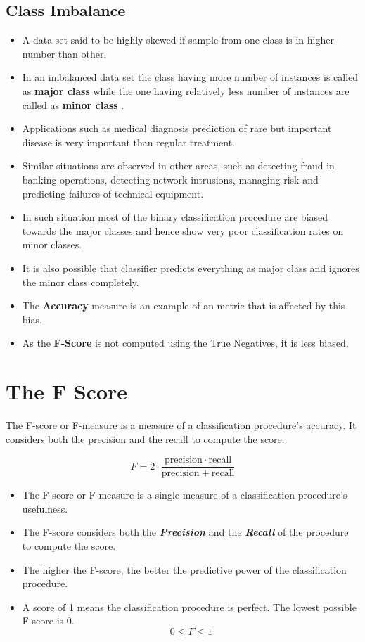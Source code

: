 \documentclass[]{report}
\begin{document}
\subsection*{Class Imbalance}
\begin{itemize}
\item 	A data set said to be highly skewed if sample from one class is in higher number than other. \item In an imbalanced data set the class having more number of instances is called as \textbf{major class} while the one having relatively less number of instances are called as \textbf{minor class} .
\item Applications such as medical diagnosis prediction of rare but important disease is very important than regular treatment. 
\item Similar situations are observed in other areas, such as detecting fraud in banking operations, detecting network intrusions, managing risk and predicting failures of technical equipment. 
\item In such situation most of the binary classification procedure are biased towards the major classes and hence show very poor classification rates on minor classes.
\item  It is also possible that classifier predicts everything as major class and ignores the minor class completely.
\item The \textbf{Accuracy} measure is an example of an metric that is affected by this bias.
\item As the \textbf{F-Score} is not computed using the True Negatives, it is less biased.
\end{itemize}


\section*{The F Score}

The F-score or F-measure is a measure of a classification procedure's accuracy.
It considers both the precision  and the recall to compute the score.

\[ F = 2 \cdot \frac{\mathrm{precision} \cdot \mathrm{recall}}{\mathrm{precision} + \mathrm{recall}}\]

\begin{itemize}
	\item The F-score or F-measure is a single measure of a classification procedure's usefulness. 
	\item The F-score considers both the \textit{\textbf{Precision}} and the \textit{\textbf{Recall}} of the procedure to compute the score.
	\item The higher the F-score, the better the predictive power of the 
	classification procedure. 
	\item A score of 1 means the classification procedure is perfect. The lowest possible F-score is 0.
	\[ 0 \leq F \leq 1 \]
\end{itemize}
\end{document}
